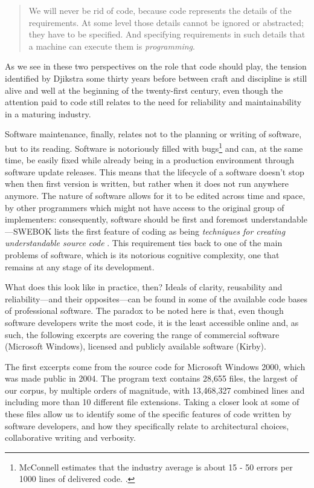 \begin{quote}
  We will never be rid of code, because code represents the details of the requirements. At some level those details cannot be ignored or abstracted; they have to be specified. And specifying requirements in such details that a machine can execute them is \emph{programming}. \citep{martin_clean_2008}
\end{quote}

As we see in these two perspectives on the role that code should play, the tension identified by Djikstra some thirty years before between craft and discipline is still alive and well at the beginning of the twenty-first century, even though the attention paid to code still relates to the need for reliability and maintainability in a maturing industry.

Software maintenance, finally, relates not to the planning or writing of software, but to its reading. Software is notoriously filled with bugs\footnote{McConnell estimates that the industry average is about 15 - 50 errors per 1000 lines of delivered code. \citep{mcconnell_code_2004}.} and can, at the same time, be easily fixed while already being in a production environment through software update releases. This means that the lifecycle of a software doesn't stop when then first version is written, but rather when it does not run anywhere anymore. The nature of software allows for it to be edited across time and space, by other programmers which might not have access to the original group of implementers: consequently, software should be first and foremost understandable—SWEBOK lists the first feature of coding as being \emph{techniques for creating understandable source code} \citep{bourque_swebok_2014}. This requirement ties back to one of the main problems of software, which is its notorious cognitive complexity, one that remains at any stage of its development.

What does this look like in practice, then? Ideals of clarity, reusability and reliability—and their opposites—can be found in some of the available code bases of professional software. The paradox to be noted here is that, even though software developers write the most code, it is the least accessible online and, as such, the following excerpts are covering the range of commercial software (Microsoft Windows), licensed and publicly available software (Kirby).

The first excerpts come from the source code for Microsoft Windows 2000, which was made public in 2004. The program text contains  28,655 files, the largest of our  corpus, by multiple orders of magnitude, with 13,468,327 combined lines and including more than 10 different file extensions. Taking a closer look at some of these files allow us to identify some of the specific features of code written by software developers, and how they specifically relate to architectural choices, collaborative writing and verbosity.


